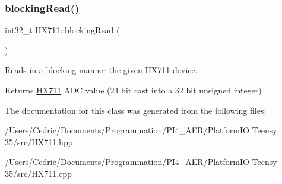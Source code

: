 \subsubsection{\texorpdfstring{blocking\+Read()}{blockingRead()}}
{\footnotesize\ttfamily int32\+\_\+t H\+X711\+::blocking\+Read (\begin{DoxyParamCaption}{ }\end{DoxyParamCaption})}



Reads in a blocking manner the given \hyperlink{class_h_x711}{H\+X711} device. 

\begin{DoxyReturn}{Returns}
\hyperlink{class_h_x711}{H\+X711} A\+DC value (24 bit cast into a 32 bit unsigned integer) 
\end{DoxyReturn}


The documentation for this class was generated from the following files\+:\begin{DoxyCompactItemize}
\item 
/\+Users/\+Cedric/\+Documents/\+Programmation/\+P\+I4\+\_\+\+A\+E\+R/\+Platform\+I\+O Teensy 35/src/H\+X711.\+hpp\item 
/\+Users/\+Cedric/\+Documents/\+Programmation/\+P\+I4\+\_\+\+A\+E\+R/\+Platform\+I\+O Teensy 35/src/H\+X711.\+cpp\end{DoxyCompactItemize}
